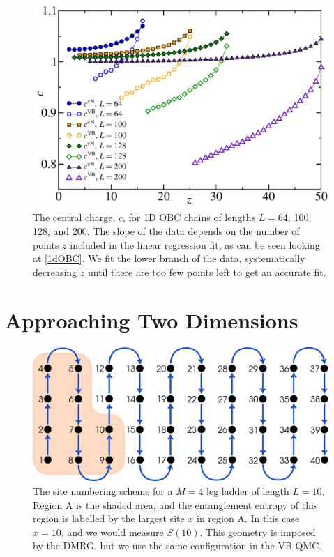 \begin{figure} {
\includegraphics[width=6in]{./figures/paper1/figure1/newfig2.pdf} 
\centering
\caption[Central charge for 1D OBC chains]{ The central charge, $c$, for 1D OBC chains of lengths $L=64$, 100, 128, and 200.
The slope of the data depends on the number of points $z$ included in the linear regression fit, as can be seen looking at \ref{1dOBC}.
We fit the lower branch of the data, systematically decreasing $z$ until there are too few points left to get an accurate fit.
\label{c2}
}}
\end{figure}


\section{Approaching Two Dimensions}

\begin{figure} { \includegraphics[width=6in]{./figures/made/stuff_covering.pdf}
\centering
\caption[Geometry of a four-leg ladder]{
The site numbering scheme for a $M=4$ leg ladder of length $L=10$.  Region A is the shaded area, and the entanglement entropy of this region is labelled by the largest site $x$ in region A.
In this case $x=10$, and we would measure $S(10)$.  
This geometry is imposed by the DMRG, but we use the same configuration in the VB QMC.
 \label{laddersnake} }} 
 \end{figure}

